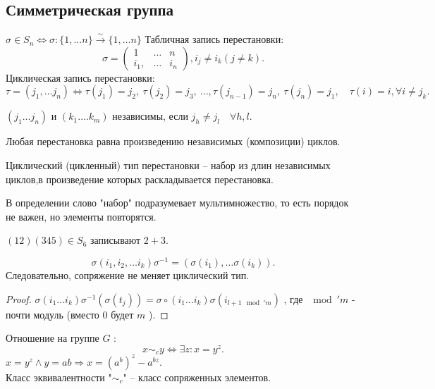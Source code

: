 \documentclass[12pt]{report}
\begin{document}
\subsection{Симметрическая группа}
\begin{defn}[Перестановка]
    $\sigma \in  S_n \Longleftrightarrow \sigma : \{1, \ldots n \} \stackrel{\sim} \to  \{1, \ldots n\}$
    Табличная запись перестановки:
    \[
    \sigma  = \left ( 
    \begin{array}{ccc}
	1 &\ldots& n \\
	i_1, & \ldots  & i_n 
    \end{array}
\right ), i_j \ne i_k (j \ne k)
    .\] 
    Циклическая запись перестановки:
    \[
	\tau = (j_1, \ldots j_n) \Longleftrightarrow 
	\tau(j_1) = j_2, ~ \tau(j_2) = j_3, ~ \ldots , \tau(j_{n-1}) = j_n, ~ \tau(j_n) = j_1, \quad \tau(i) = i, \forall i \ne j_k
    .\] 
\end{defn}
\begin{defn}
    $(j_1 \ldots j_n)$ и $(k_1 \ldots .k_m)$ независимы, если $j_h \ne j_l \quad \forall h, l$.
\end{defn}
\begin{lm}
    Любая перестановка равна произведению независимых (композиции) циклов.
\end{lm}
\begin{defn}
    Циклический (цикленный) тип перестановки -- набор из длин независимых циклов,в произведение которых раскладывается перестановка.
\end{defn}
\begin{note}
    В определении слово "набор" подразумевает мультимножество, то есть порядок не важен, но элементы повторятся.
\end{note}
\begin{ex}
    $(12) (345) \in  S_6$ записывают $2 + 3$.
\end{ex}
\begin{lm}\label{lm_sim_group_1}
    \[
	\sigma (i_1, i_2, \ldots i_k) \sigma ^{-1} = ( \sigma (i_1), \ldots \sigma (i_k))
    .\] 
    Следовательно, сопряжение не меняет циклический тип.
\end{lm}
\begin{proof}
    $\sigma (i_1 \ldots i_k) \sigma ^{-1} (\sigma (t_j))=  \sigma \circ (i_1 \ldots i_k) \sigma  (i_{l+1 \mod' m})$
    , где $\mod ' m$ - почти модуль (вместо 0 будет $m$ ).
\end{proof}
\begin{defn}
    Отношение на группе $G$ :
    \[
    x \sim_c y \Leftrightarrow \exists z: x = y^z
    .\] 
    $x=y^z \wedge y=ab \Rightarrow x = (a^b)^z - a^{bz}$.\\
    Класс эквивалентности "$\sim _c$" -- класс сопряженных элементов.
\end{defn}
\end{document}
